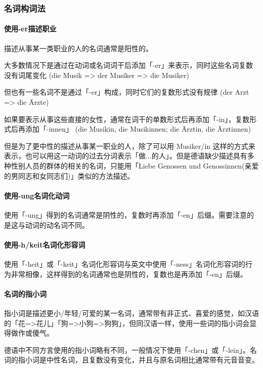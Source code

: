 \subsubsection{名词构词法}

\paragraph{使用-er描述职业}

描述从事某一类职业的人的名词通常是阳性的。

大多数情况下是通过在动词或名词词干后添加「-er」来表示，同时这些名词复数没有词尾变化 (die Musik => der Musiker => die Musiker)

但也有一些名词不是通过「-er」构成，同时它们的复数形式没有规律 (der Arzt => die Ärzte)

如果要表示从事这些直接的女性，通常在词干的单数形式后再添加「-in」，复数形式后再添加「-innen」 (die Musikin, die Musikinnen; die Ärztin, die Ärztinnen)

但是为了更中性的描述从事某一职业的人，除了可以用 Musiker/in 这样的方式来表示，也可以用这一动词的过去分词表示「做...的人」。但是德语缺少描述具有多种性别人员的群体的相关的名词，只能用「Liebe Genossen und Genossinnen(亲爱的男同志和女同志们)」类似的方法描述。

\paragraph{使用-ung名词化动词}

使用「-ung」得到的名词通常是阴性的，复数时再添加「-en」后缀。需要注意的是这与动词的动名词不同。

\paragraph{使用-h/keit名词化形容词}

使用「-heit」或「-keit」名词化形容词与英文中使用「-ness」名词化形容词的行为非常相像，这样得到的名词通常也是阴性的，复数也是再添加「-en」后缀。

\paragraph{名词的指小词}

指小词是描述更小/年轻/可爱的某一名词，通常带有非正式、喜爱的感觉，如汉语的「花=>花儿」「狗=>小狗=>狗狗」，但同汉语一样，使用一些词的指小词会显得做作或傻气。

德语中不同方言使用的指小词略有不同，一般情况下使用「-chen」或「-lein」。名词的指小词是中性名词，且复数没有变化，并且与原名词相比通常带有元音音变。

